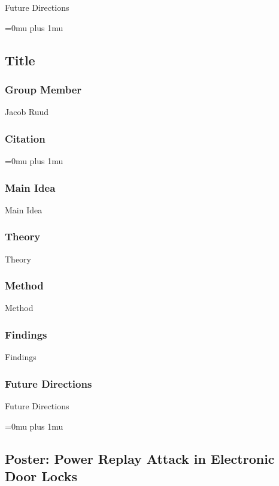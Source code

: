 \noindent
Future Directions 

\Urlmuskip=0mu plus 1mu\relax

\noindent
\subsection{Title}

\subsubsection{Group Member}

\noindent
Jacob Ruud

\noindent
\subsubsection{Citation}

\Urlmuskip=0mu plus 1mu\relax

\subsubsection{Main Idea}

\noindent
Main Idea

\subsubsection{Theory}

\noindent
Theory

\subsubsection{Method}

\noindent
Method

\subsubsection{Findings}

\noindent
Findings

\subsubsection{Future Directions}

\noindent
Future Directions 

\Urlmuskip=0mu plus 1mu\relax

\noindent
\subsection{Poster: Power Replay Attack in Electronic Door Locks}

